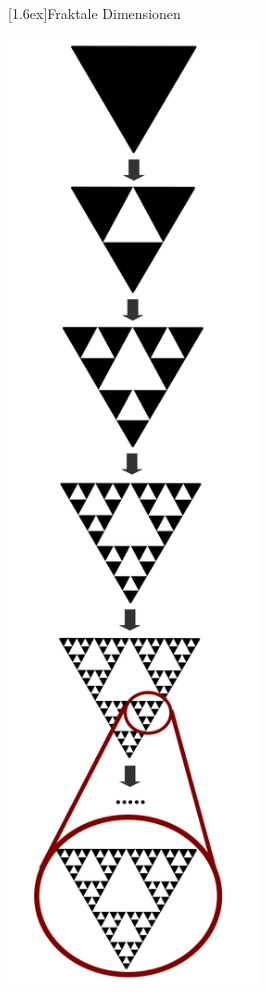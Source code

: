 \documentclass[final]{beamer}
\newlength{\columnheight}
\newlength{\marginw}
\newlength{\tw}
\newlength{\colw}
\newenvironment{myTwoColPoster}{%
  \begin{minipage}[t]{\textwidth}%
    \hspace*{\marginw}%
    \hspace*{9.5bp}%
    \begin{minipage}[t]{\tw}}%
  {\end{minipage}%
   \hspace*{\marginw}%
   \end{minipage}}
\newenvironment{myCol}%
    {\begin{minipage}[t][\columnheight][t]{\colw}}%
    {\end{minipage}}
\newenvironment{textblock}[1]%
    {\begin{block}{\rule[-0.6ex]{0pt}{2.4ex}\raisebox{-0.25ex}[1.6ex]{#1}}%
     \vspace*{5mm}}%
    {\vspace*{5mm}\end{block}}
\begin{document}
\begin{frame}[t]{}
\begin{myTwoColPoster}
\begin{myCol}
\begin{textblock}{Fraktale Dimensionen}
\begin{minipage}[c]{0.35\textwidth}
\begin{center}
        \includegraphics[width=0.5\textwidth]{fig/sierpinski2}
      \end{center}

  \end{minipage}

\end{textblock}


\end{myCol}%
\end{myTwoColPoster}
\end{frame}
\end{document}
